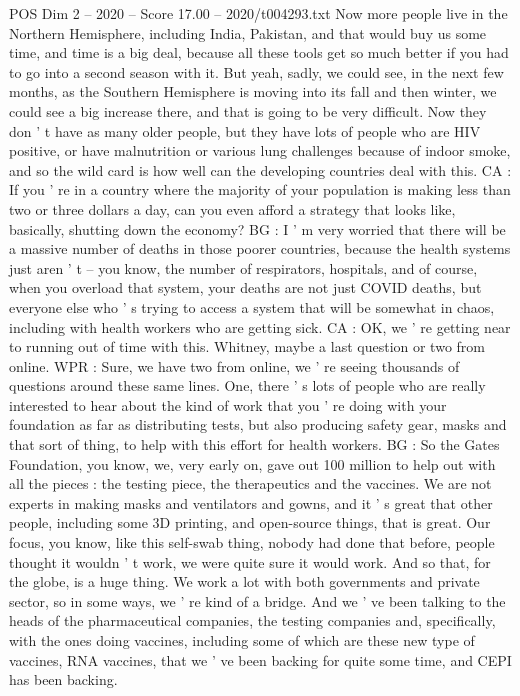 \begin{textsample}{POS Dim 2 – 2020 – Score 17.00 – 2020/t004293.txt}
Now more people live in the Northern Hemisphere, including India, Pakistan, and that would buy us some time, and time is a big deal, because all these tools get so much better if you had to go into a second season with it.
But yeah, sadly, we could see, in the next few months, as the Southern Hemisphere is moving into its fall and then winter, we could see a big increase there, and that is going to be very difficult.
Now they don ' t have as many older people, but they have lots of people who are HIV positive, or have malnutrition or various lung challenges because of indoor smoke, and so the wild card is how well can the developing countries deal with this.
CA : If you ' re in a country where the majority of your population is making less than two or three dollars a day, can you even afford a strategy that looks like, basically, shutting down the economy?
BG : I ' m very worried that there will be a massive number of deaths in those poorer countries, because the health systems just aren ' t -- you know, the number of respirators, hospitals, and of course, when you overload that system, your deaths are not just COVID deaths, but everyone else who ' s trying to access a system that will be somewhat in chaos, including with health workers who are getting sick.
CA : OK, we ' re getting near to running out of time with this.
Whitney, maybe a last question or two from online.
WPR : Sure, we have two from online, we ' re seeing thousands of questions around these same lines.
One, there ' s lots of people who are really interested to hear about the kind of work that you ' re doing with your foundation as far as distributing tests, but also producing safety gear, masks and that sort of thing, to help with this effort for health workers.
BG : So the Gates Foundation, you know, we, very early on, gave out 100 million to help out with all the pieces : the testing piece, the therapeutics and the vaccines.
We are not experts in making masks and ventilators and gowns, and it ' s great that other people, including some 3D printing, and open-source things, that is great.
Our focus, you know, like this self-swab thing, nobody had done that before, people thought it wouldn ' t work, we were quite sure it would work.
And so that, for the globe, is a huge thing.
We work a lot with both governments and private sector, so in some ways, we ' re kind of a bridge.
And we ' ve been talking to the heads of the pharmaceutical companies, the testing companies and, specifically, with the ones doing vaccines, including some of which are these new type of vaccines, RNA vaccines, that we ' ve been backing for quite some time, and CEPI has been backing.

\end{textsample}
